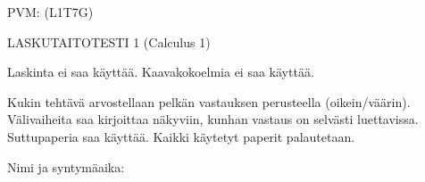 \documentclass[finnish, a4paper, 12pt]{article}
\begin{document}
	
	
		PVM: \underline{\phantom{mm.mm.}}
		\hfill
		(L1T7G)	%
	
	\begin{center}
		{\large
			LASKUTAITOTESTI 1 (Calculus 1)}
	\end{center}
	
	Laskinta ei saa käyttää. Kaavakokoelmia ei saa käyttää.
	
	Kukin tehtävä arvostellaan pelkän vastauksen perusteella (oikein/väärin).
	Välivaiheita saa kirjoittaa näkyviin, kunhan vastaus on selvästi luettavissa.
	Suttupaperia saa käyttää. Kaikki käytetyt paperit palautetaan.
	
\vspace{12pt}
Nimi ja syntymäaika: \phantom{m} \hrulefill
\vspace{8pt}
	
\end{document}
